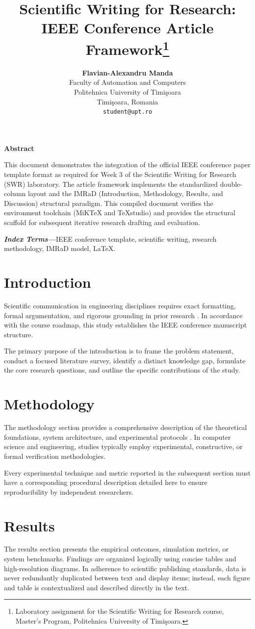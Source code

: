 \documentclass[10pt,twocolumn,a4paper]{article}
\title{\LARGE\textbf{Scientific Writing for Research: IEEE Conference Article Framework}\thanks{Laboratory assignment for the Scientific Writing for Research course, Master's Program, Politehnica University of Timi\c{s}oara.}}
\author{
  \textbf{Flavian-Alexandru Manda} \\
  Faculty of Automation and Computers \\
  Politehnica University of Timi\c{s}oara \\
  Timi\c{s}oara, Romania \\
  \texttt{student@upt.ro}
}
\date{}
\renewenvironment{abstract}{%
  \begin{center}\bfseries\small Abstract\end{center}%
  \quotation\small\itshape
}{\endquotation\vspace{1em}}
\newcommand{\keywords}[1]{\par\vspace{0.5em}\noindent\textbf{\textit{Index Terms---}}#1\par\vspace{1em}}
\begin{document}
\maketitle

\begin{abstract}
This document demonstrates the integration of the official IEEE conference paper template format as required for Week 3 of the Scientific Writing for Research (SWR) laboratory. The article framework implements the standardized double-column layout and the IMRaD (Introduction, Methodology, Results, and Discussion) structural paradigm. This compiled document verifies the environment toolchain (MiKTeX and TeXstudio) and provides the structural scaffold for subsequent iterative research drafting and evaluation.
\end{abstract}

\keywords{IEEE conference template, scientific writing, research methodology, IMRaD model, LaTeX.}

\section{Introduction}
Scientific communication in engineering disciplines requires exact formatting, formal argumentation, and rigorous grounding in prior research \cite{ecarnot2015writing}. In accordance with the course roadmap, this study establishes the IEEE conference manuscript structure. 

The primary purpose of the introduction is to frame the problem statement, conduct a focused literature survey, identify a distinct knowledge gap, formulate the core research questions, and outline the specific contributions of the study.

\section{Methodology}
The methodology section provides a comprehensive description of the theoretical foundations, system architecture, and experimental protocols \cite{thuan2019construction}. In computer science and engineering, studies typically employ experimental, constructive, or formal verification methodologies.

Every experimental technique and metric reported in the subsequent section must have a corresponding procedural description detailed here to ensure reproducibility by independent researchers.

\section{Results}
The results section presents the empirical outcomes, simulation metrics, or system benchmarks. Findings are organized logically using concise tables and high-resolution diagrams. In adherence to scientific publishing standards, data is never redundantly duplicated between text and display items; instead, each figure and table is contextualized and described directly in the text.
\end{document}

